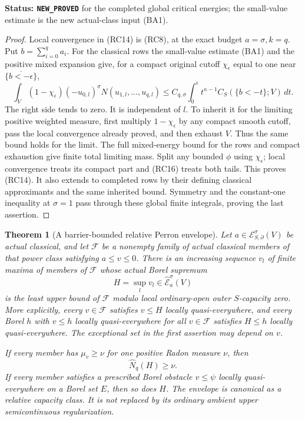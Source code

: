 \documentclass[11pt,a4paper]{article}
\numberwithin{equation}{section}
\newtheorem{theorem}{Theorem}[section]
\theoremstyle{definition}
\theoremstyle{remark}
\begin{document}
\noindent\textbf{Status: \texttt{NEW\_PROVED}} for the
completed global critical energies; the small-value estimate
is the new actual-class input (BA1).

\begin{proof}
Local convergence in (RC14) is (RC8), at the exact budget
$a=\sigma,k=q$. Put $b=\sum_{i=0}^q a_i$.
For the classical rows the small-value estimate (BA1) and
the positive mixed expansion give, for a compact original
cutoff $\chi_\epsilon$ equal to one near
$\overline{\{b<-\epsilon\}}$,
\[
 \int_V(1-\chi_\epsilon)(-u_{0,l})^\sigma
                       N(u_{1,l},\ldots,u_{q,l})
       \leq C_{q,\sigma}
                   \int_0^\epsilon t^{\kappa-1}
                                 C_S(\{b<-t\};V)\,dt.
 \tag{RC16}
\]
The right side tends to zero. It is independent of $l$.
To inherit it for the limiting positive weighted measure,
first multiply $1-\chi_\epsilon$ by any compact smooth
cutoff, pass the local convergence already proved, and
then exhaust $V$. Thus the same bound holds for the limit.
The full mixed-energy bound for the rows and compact exhaustion
give finite total limiting mass. Split any bounded $\phi$
using $\chi_\epsilon$; local convergence treats its compact
part and (RC16) treats both tails. This proves (RC14).
It also extends to completed rows by their defining classical
approximants and the same inherited bound. Symmetry and the
constant-one inequality at $\sigma=1$ pass through these
global finite integrals, proving the last assertion.
\end{proof}

\begin{theorem}[A barrier-bounded relative Perron envelope]
\label{thm:r11-barrier-relative-Perron}
Let $a\in\mathcal E^\sigma_{S,\partial}(V)$ be actual
classical, and let $\mathscr F$ be a nonempty family of
actual classical members of that power class satisfying
$a\leq v\leq0$. There is an increasing sequence $v_l$
of finite maxima of members of $\mathscr F$ whose actual
Borel supremum
\[
                       H=\sup_l v_l
                          \in\widehat{\mathcal E}^{\sigma}_a(V)
 \tag{RC17}
\]
is the least upper bound of $\mathscr F$ modulo local
ordinary-open outer $S$-capacity zero. More explicitly,
every $v\in\mathscr F$ satisfies $v\leq H$ locally
quasi-everywhere, and every Borel $h$ with $v\leq h$
locally quasi-everywhere for all $v\in\mathscr F$ satisfies
$H\leq h$ locally quasi-everywhere. The exceptional set in
the first assertion may depend on $v$.

If every member has $\mu_v\geq\nu$ for one positive
Radon measure $\nu$, then
\[
                              \widehat N_q(H)\geq\nu.
 \tag{RC18}
\]
If every member satisfies a prescribed Borel obstacle
$v\leq\psi$ locally quasi-everywhere on a Borel set $E$,
then so does $H$. The envelope is canonical as a relative
capacity class. It is not replaced by its ordinary ambient
upper semicontinuous regularization.
\end{theorem}
\end{document}
